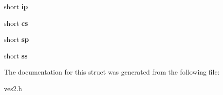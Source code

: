 \begin{DoxyCompactItemize}
\item 
short {\bfseries ip}\label{struct__RMREGS_acb45fae3e4b8f2020a7792e69de6dd92}

\item 
short {\bfseries cs}\label{struct__RMREGS_a1b2b0739e32fb251314a6bf45e844ab1}

\item 
short {\bfseries sp}\label{struct__RMREGS_a268d53d9c6951ab53288a6df7db1a550}

\item 
short {\bfseries ss}\label{struct__RMREGS_ac821365f3a51f8db3d28475f7dc8b624}

\end{DoxyCompactItemize}


The documentation for this struct was generated from the following file\-:\begin{DoxyCompactItemize}
\item 
ves2.\-h\end{DoxyCompactItemize}
